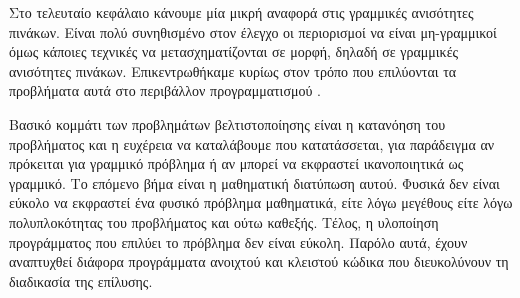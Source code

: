 Στο τελευταίο κεφάλαιο κάνουμε μία μικρή αναφορά στις γραμμικές ανισότητες
πινάκων. Είναι πολύ συνηθισμένο στον έλεγχο οι περιορισμοί να είναι μη-γραμμικοί
όμως κάποιες τεχνικές να μετασχηματίζονται σε  μορφή, δηλαδή σε
γραμμικές ανισότητες πινάκων. Επικεντρωθήκαμε κυρίως στον τρόπο που επιλύονται
τα προβλήματα αυτά στο περιβάλλον προγραμματισμού .

Βασικό κομμάτι των προβλημάτων βελτιστοποίησης είναι η κατανόηση του προβλήματος
και η ευχέρεια να καταλάβουμε που κατατάσσεται, για παράδειγμα αν πρόκειται για
γραμμικό πρόβλημα ή αν μπορεί να εκφραστεί ικανοποιητικά ως γραμμικό. Το επόμενο
βήμα είναι η μαθηματική διατύπωση αυτού. Φυσικά δεν είναι εύκολο να εκφραστεί
ένα φυσικό πρόβλημα μαθηματικά, είτε λόγω μεγέθους είτε λόγω πολυπλοκότητας του
προβλήματος και ούτω καθεξής. Τέλος, η υλοποίηση προγράμματος που επιλύει το
πρόβλημα δεν είναι εύκολη. Παρόλο αυτά, έχουν αναπτυχθεί διάφορα προγράμματα
ανοιχτού και κλειστού κώδικα που διευκολύνουν τη διαδικασία της επίλυσης.
